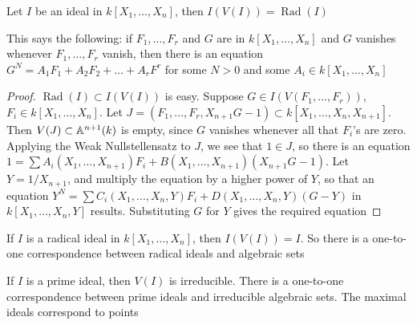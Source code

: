 \documentclass[11pt]{article}
\DeclareMathOperator{\Rad}{\text{Rad}}
\begin{document}
\begin{theorem}
Let \(I\) be an ideal in \(k[X_1,\dots,X_n]\), then \(I(V(I))=\Rad(I)\)
\end{theorem}

This says the following: if \(F_1,\dots,F_r\) and \(G\) are in \(k[X_1,\dots,X_n]\) and \(G\) vanishes
whenever \(F_1,\dots,F_r\) vanish, then there is an equation \(G^N=A_1F_1+A_2F_2+\dots+A_rF^r\) for some \(N>0\)
and some \(A_i\in k[X_1,\dots,X_n]\)

\begin{proof}
\(\Rad(I)\subset I(V(I))\) is easy. Suppose \(G\in I(V(F_1,\dots,F_r))\), \(F_i\in k[X_1,\dots,X_n]\).
Let \(J=(F_1,\dots,F_r,X_{n+1}G-1)\subset k[X_1,\dots,X_n,X_{n+1}]\). Then \(V(J)\subset\mathbb{A}^{n+1}(k)\) is empty,
since \(G\) vanishes whenever all that \(F_i\)'s are zero. Applying the Weak Nullstellensatz
to \(J\), we see that \(1\in J\), so there is an
equation \(1=\sum A_i(X_1,\dots,X_{n+1})F_i+B(X_1,\dots,X_{n+1})(X_{n+1}G-1)\). Let \(Y=1/X_{n+1}\), and
multiply the equation by a higher power of \(Y\), so that an equation
\(Y^N=\sum C_i(X_1,\dots,X_n,Y)F_i+D(X_1,\dots,X_n,Y)(G-Y)\) in \(k[X_1,\dots,X_n,Y]\) results. Substituting \(G\)
for \(Y\) gives the required equation
\end{proof}

\begin{corollary}[]
If \(I\) is a radical ideal in \(k[X_1,\dots,X_n]\), then \(I(V(I))=I\). So there is a one-to-one
correspondence between radical ideals and algebraic sets
\end{corollary}

\begin{corollary}[]
If \(I\) is a prime ideal, then \(V(I)\) is irreducible. There is a one-to-one correspondence
between prime ideals and irreducible algebraic sets. The maximal ideals correspond to points
\end{corollary}
\end{document}
